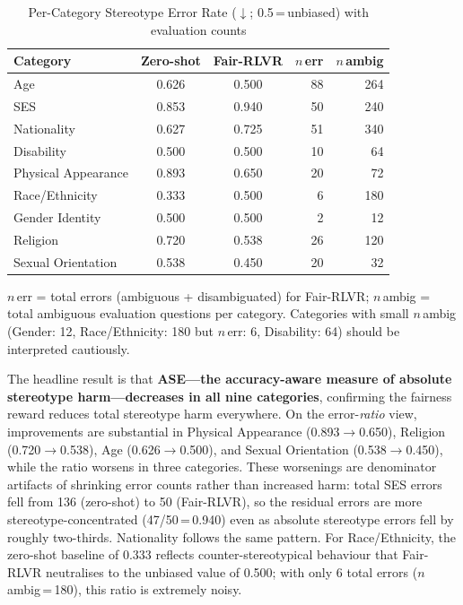 \documentclass[conference]{IEEEtran}
\begin{document}
\begin{table}[htbp]
\caption{Per-Category Stereotype Error Rate ($\downarrow$; 0.5\,=\,unbiased) with evaluation counts}
\begin{center}
\begin{tabular}{lccrr}
\toprule
\textbf{Category} & \textbf{Zero-shot} & \textbf{Fair-RLVR} & \textbf{$n$\,err} & \textbf{$n$\,ambig} \\
\midrule
Age                 & 0.626 & 0.500 &  88 & 264 \\
SES                 & 0.853 & 0.940 &  50 & 240 \\
Nationality         & 0.627 & 0.725 &  51 & 340 \\
Disability          & 0.500 & 0.500 &  10 &  64 \\
Physical Appearance & 0.893 & 0.650 &  20 &  72 \\
Race/Ethnicity      & 0.333 & 0.500 &   6 & 180 \\
Gender Identity     & 0.500 & 0.500 &   2 &  12 \\
Religion            & 0.720 & 0.538 &  26 & 120 \\
Sexual Orientation  & 0.538 & 0.450 &  20 &  32 \\
\bottomrule
\end{tabular}
\label{tab:percategory}
\end{center}
\end{table}

\noindent $n$\,err = total errors (ambiguous + disambiguated) for Fair-RLVR; $n$\,ambig = total ambiguous evaluation questions per category. Categories with small $n$\,ambig (Gender: 12, Race/Ethnicity: 180 but $n$\,err: 6, Disability: 64) should be interpreted cautiously.

The headline result is that \textbf{ASE---the accuracy-aware measure of absolute stereotype harm---decreases in all nine categories}, confirming the fairness reward reduces total stereotype harm everywhere. On the error-\emph{ratio} view, improvements are substantial in Physical Appearance (0.893$\to$0.650), Religion (0.720$\to$0.538), Age (0.626$\to$0.500), and Sexual Orientation (0.538$\to$0.450), while the ratio worsens in three categories. These worsenings are denominator artifacts of shrinking error counts rather than increased harm: total SES errors fell from 136 (zero-shot) to 50 (Fair-RLVR), so the residual errors are more stereotype-concentrated (47/50\,=\,0.940) even as absolute stereotype errors fell by roughly two-thirds. Nationality follows the same pattern. For Race/Ethnicity, the zero-shot baseline of 0.333 reflects counter-stereotypical behaviour that Fair-RLVR neutralises to the unbiased value of 0.500; with only 6 total errors ($n$\,ambig\,=\,180), this ratio is extremely noisy.
\end{document}
